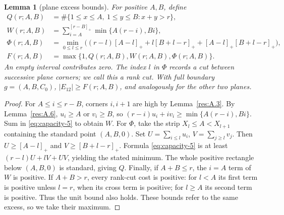 \documentclass[11pt]{article}
\newtheorem{lemma}[theorem]{Lemma}
\theoremstyle{definition}
\theoremstyle{remark}
\theoremstyle{plain}
\begin{document}
\begin{lemma}[plane excess bounds]\label{res:A.8}
For positive $A,B$, define
\[
\begin{split}
 Q(r;A,B)&=\#\{1\le x\le A,\ 1\le y\le B:x+y>r\},\\
 W(r;A,B)&=\sum_{i=A}^{[r-B]_+}\min\{A(r-i),Bi\},\\
 \Phi(r;A,B)&=\min_{0\le l\le r}\bigl((r-l)[A-l]_+
             +l[B+l-r]_++[A-l]_+[B+l-r]_+\bigr),\\
 F(r;A,B)&=\max\{1,Q(r;A,B),W(r;A,B),\Phi(r;A,B)\}.
\end{split}
\]
An empty interval contributes zero. The index $l$ in $\Phi$ records
a cut between successive plane corners; we call this a rank cut.
With full boundary $g=(A,B,C_0)$,
$|E_{12}|\ge F(r;A,B)$, and analogously for the other two planes.
\end{lemma}
\begin{proof}
For $A\le i\le r-B$, corners $i,i+1$ are high by Lemma~\ref{res:A.3}. By Lemma~\ref{res:A.6},
$u_i\ge A$ or $v_i\ge B$, so
$(r-i)u_i+iv_i\ge\min\{A(r-i),Bi\}$. Sum in \eqref{eq:capacity-5} to obtain $W$.
For $\Phi$, take the strip $X_l\le A<X_{l+1}$ containing the standard
point $(A,B,0)$. Set $U=\sum_{i\le l}u_i$, $V=\sum_{j\ge l}v_j$.
Then $U\ge[A-l]_+$ and $V\ge[B+l-r]_+$. Formula \eqref{eq:capacity-5} is at least
$(r-l)U+lV+UV$, yielding the stated minimum.
The whole positive rectangle below $(A,B,0)$ is standard, giving $Q$.
Finally, if $A+B\le r$, the $i=A$ term of $W$ is positive.
If $A+B>r$, every rank-cut cost is positive: for $l<A$ its first
term is positive unless $l=r$, when its cross term is positive;
for $l\ge A$ its second term is positive. Thus the unit bound also holds.
These bounds refer to the same excess, so we take their maximum.
\end{proof}
\end{document}
